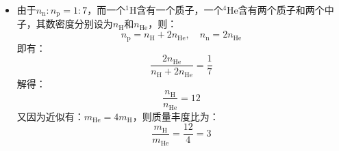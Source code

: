 \documentclass[a4paper,fontset=none]{ctexart}
\begin{document}
\begin{itemize}
\item[2.]
由于$n_{\mathrm{n}}:n_{\mathrm{p}}=1:7$，而一个$^{1}\mathrm{H}$含有一个质子，一个$^{4}\mathrm{He}$含有两个质子和两个中子，其数密度分别设为$n_{\mathrm{H}}$和$n_\mathrm{He}$，则：
\[
n_{\mathrm{p}} = n_{\mathrm{H}} + 2n_\mathrm{He},\quad
n_{\mathrm{n}} = 2n_\mathrm{He}
\]
即有：
\[
\frac{2n_\mathrm{He}}{n_{\mathrm{H}} + 2n_\mathrm{He}} = \frac{1}{7}
\]
解得：
\[
\frac{n_{\mathrm{H}}}{n_{\mathrm{He}}} = 12
\]
又因为近似有：$m_{\mathrm{He}}=4m_{\mathrm{H}}$，则质量丰度比为：
\[
\frac{m_{\mathrm{H}}}{m_{\mathrm{He}}} = \frac{12}{4} = 3
\]

\end{itemize}
\end{document}
